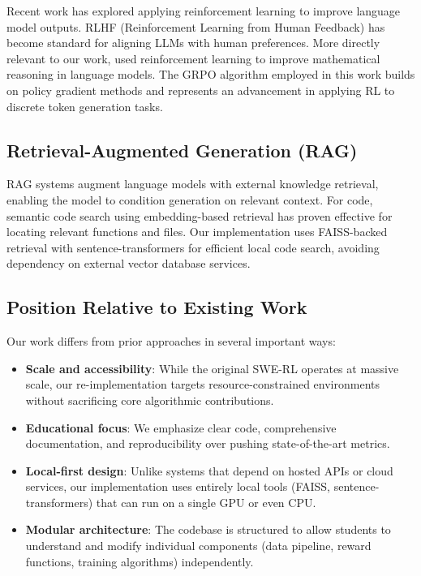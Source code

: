 \documentclass{article} %
\begin{document}
Recent work has explored applying reinforcement learning to improve language model outputs. RLHF (Reinforcement Learning from Human Feedback) \citep{ouyang2022training} has become standard for aligning LLMs with human preferences. More directly relevant to our work, \citet{cobbe2021training} used reinforcement learning to improve mathematical reasoning in language models. The GRPO algorithm employed in this work builds on policy gradient methods and represents an advancement in applying RL to discrete token generation tasks.

\subsection{Retrieval-Augmented Generation (RAG)}

RAG systems \citep{lewis2020retrieval} augment language models with external knowledge retrieval, enabling the model to condition generation on relevant context. For code, semantic code search using embedding-based retrieval \citep{cambronero2023open} has proven effective for locating relevant functions and files. Our implementation uses FAISS-backed retrieval with sentence-transformers for efficient local code search, avoiding dependency on external vector database services.

\subsection{Position Relative to Existing Work}

Our work differs from prior approaches in several important ways:
\begin{itemize}
    \item \textbf{Scale and accessibility}: While the original SWE-RL operates at massive scale, our re-implementation targets resource-constrained environments without sacrificing core algorithmic contributions.
    \item \textbf{Educational focus}: We emphasize clear code, comprehensive documentation, and reproducibility over pushing state-of-the-art metrics.
    \item \textbf{Local-first design}: Unlike systems that depend on hosted APIs or cloud services, our implementation uses entirely local tools (FAISS, sentence-transformers) that can run on a single GPU or even CPU.
    \item \textbf{Modular architecture}: The codebase is structured to allow students to understand and modify individual components (data pipeline, reward functions, training algorithms) independently.
\end{itemize}
\end{document}
